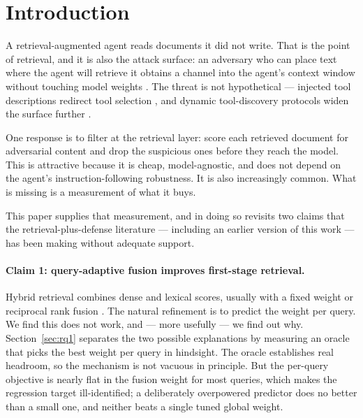 \documentclass{article}
\begin{document}
\section{Introduction}

A retrieval-augmented agent \citep{lewis2020rag} reads documents it did not write. That is the point
of retrieval, and it is also the attack surface: an adversary who can place text
where the agent will retrieve it obtains a channel into the agent's context
window without touching model weights
\citep{greshake2023indirect,zou2024poisonedrag}. The threat is not
hypothetical --- injected tool descriptions redirect tool selection
\citep{shi2025toolhijacker}, and dynamic tool-discovery protocols widen the
surface further \citep{hou2025mcp}.

One response is to filter at the retrieval layer: score each retrieved document
for adversarial content and drop the suspicious ones before they reach the
model. This is attractive because it is cheap, model-agnostic, and does not
depend on the agent's instruction-following robustness. It is also increasingly
common. What is missing is a measurement of what it buys.

This paper supplies that measurement, and in doing so revisits two claims that
the retrieval-plus-defense literature --- including an earlier version of this
work --- has been making without adequate support.

\paragraph{Claim 1: query-adaptive fusion improves first-stage retrieval.}
Hybrid retrieval combines dense and lexical scores, usually with a fixed weight
or reciprocal rank fusion \citep{cormack2009rrf,bruch2023fusion}. The natural
refinement is to predict the weight per query. We find this does not work, and
--- more usefully --- we find out why. Section~\ref{sec:rq1} separates the two
possible explanations by measuring an oracle that picks the best weight per
query in hindsight. The oracle establishes real headroom, so the mechanism is
not vacuous in principle. But the per-query objective is nearly flat in the
fusion weight for most queries, which makes the regression target
ill-identified; a deliberately overpowered predictor does no better than a small
one, and neither beats a single tuned global weight.
\end{document}
